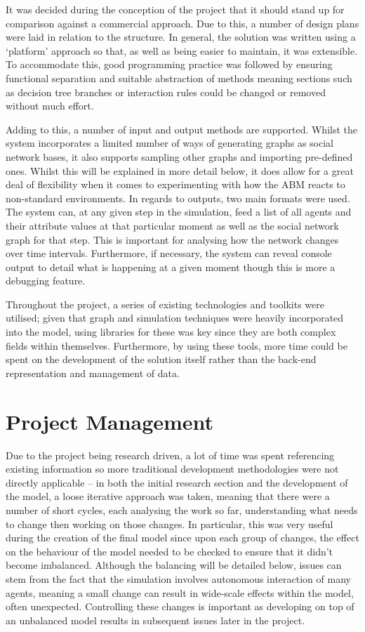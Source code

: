 \documentclass[]{report}
\begin{document}
It was decided during the conception of the project that it should stand up for comparison against a commercial approach. Due to this, a number of design plans were laid in relation to the structure. In general, the solution was written using a `platform' approach so that, as well as being easier to maintain, it was extensible. To accommodate this, good programming practice was followed by ensuring functional separation and suitable abstraction of methods meaning sections such as decision tree branches or interaction rules could be changed or removed without much effort.

Adding to this, a number of input and output methods are supported. Whilst the system incorporates a limited number of ways of generating graphs as social network bases, it also supports sampling other graphs and importing pre-defined ones. Whilst this will be explained in more detail below, it does allow for a great deal of flexibility when it comes to experimenting with how the ABM reacts to non-standard environments. In regards to outputs, two main formats were used. The system can, at any given step in the simulation, feed a list of all agents and their attribute values at that particular moment as well as the social network graph for that step. This is important for analysing how the network changes over time intervals. Furthermore, if necessary, the system can reveal console output to detail what is happening at a given moment though this is more a debugging feature.

Throughout the project, a series of existing technologies and toolkits were utilised; given that graph and simulation techniques were heavily incorporated into the model, using libraries for these was key since they are both complex fields within themselves. Furthermore, by using these tools, more time could be spent on the development of the solution itself rather than the back-end representation and management of data.

\section{Project Management}

Due to the project being research driven, a lot of time was spent referencing existing information so more traditional development methodologies were not directly applicable – in both the initial research section and the development of the model, a loose iterative approach was taken, meaning that there were a number of short cycles, each analysing the work so far, understanding what needs to change then working on those changes. In particular, this was very useful during the creation of the final model since upon each group of changes, the effect on the behaviour of the model needed to be checked to ensure that it didn't become imbalanced. Although the balancing will be detailed below, issues can stem from the fact that the simulation involves autonomous interaction of many agents, meaning a small change can result in wide-scale effects within the model, often unexpected. Controlling these changes is important as developing on top of an unbalanced model results in subsequent issues later in the project.
\end{document}
